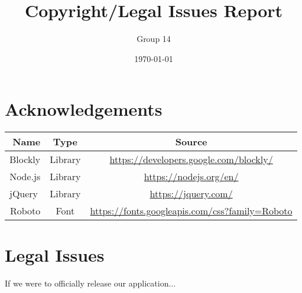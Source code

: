 \documentclass[a4wide, 11pt]{article}
\begin{document}
\title{Copyright/Legal Issues Report}

\author{Group 14}

\date{\today}         %

\maketitle            %

\section{Acknowledgements}


\begin{center}
\label{fig:table}
\begin{tabular}{rcc}
\hline
Name                       & Type                        & Source                                         \\ \hline
Blockly                    & Library                     & \url{https://developers.google.com/blockly/}         \\
Node.js                    & Library                     & \url{https://nodejs.org/en/}                         \\
\multicolumn{1}{l}{jQuery} & \multicolumn{1}{l}{Library} & \url{https://jquery.com/}                            \\
Roboto                     & Font                        & \url{https://fonts.googleapis.com/css?family=Roboto} \\ \hline
\end{tabular}
\end{center}


\section{Legal Issues}

If we were to officially release our application...
\end{document}

